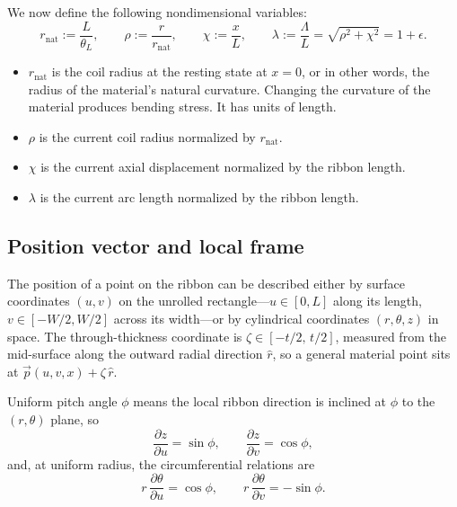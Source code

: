 \documentclass[11pt]{article}
\begin{document}
We now define the following nondimensional variables:
\begin{equation}\label{eq:nondim}
    \boxed{\;
    r_{\mathrm{nat}} := \frac{L}{\theta_L}, \qquad
    \rho := \frac{r}{r_{\mathrm{nat}}}, \qquad
    \chi := \frac{x}{L}, \qquad
    \lambda := \frac{\Lambda}{L} = \sqrt{\rho^{2}+\chi^{2}} = 1 + \epsilon.\;}
\end{equation}
\begin{itemize}
    \item $r_{\mathrm{nat}}$ is the coil radius at the resting state at $x = 0$, or in other words, the radius of the material's natural curvature. Changing the curvature of the material produces bending stress. It has units of length.
    \item $\rho$ is the current coil radius normalized by $r_{\mathrm{nat}}$.
    \item $\chi$ is the current axial displacement normalized by the ribbon length.
    \item $\lambda$ is the current arc length normalized by the ribbon length.
\end{itemize}

\subsection{Position vector and local frame}\label{sec:position}
The position of a point on the ribbon can be described either by surface coordinates $(u,v)$ on the unrolled
rectangle---$u \in [0,L]$ along its length, $v \in [-W/2, W/2]$ across its
width---or by cylindrical coordinates $(r,\theta,z)$ in space. The
through-thickness coordinate is $\zeta \in [-t/2,\, t/2]$, measured from the
mid-surface along the outward radial direction $\hat r$, so a general material
point sits at $\vec p(u,v,x) + \zeta\,\hat r$.

Uniform pitch angle $\phi$ means the local ribbon direction is inclined at $\phi$
to the $(r,\theta)$ plane, so
\begin{equation}\label{eq:frame_rotation}
    \frac{\partial z}{\partial u} = \sin\phi, \qquad
    \frac{\partial z}{\partial v} = \cos\phi,
\end{equation}
and, at uniform radius, the circumferential relations are
\begin{equation}\label{eq:dtheta}
    r\,\frac{\partial \theta}{\partial u} = \cos\phi, \qquad
    r\,\frac{\partial \theta}{\partial v} = -\sin\phi.
\end{equation}
\end{document}
